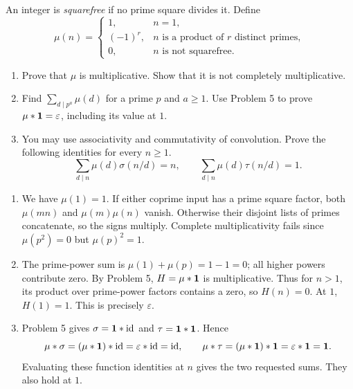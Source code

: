 \instructorbreak
{}
An integer is \emph{squarefree} if no prime square divides it. Define
\[
  \mu(n)=
  \begin{cases}
    1,&n=1,\\
    (-1)^r,&n\text{ is a product of }r\text{ distinct primes},\\
    0,&n\text{ is not squarefree}.
  \end{cases}
\]
\begin{enumerate}
  \item Prove that $\mu$ is multiplicative. Show that it is not
  completely multiplicative. 
  \item Find $\sum_{d\mid p^a}\mu(d)$ for a prime $p$ and $a\ge1$.
  Use Problem 5 to prove $\mu*\mathbf{1}=\varepsilon$, including its
  value at $1$. 
  \item You may use associativity and commutativity of convolution.
  Prove the following identities for every $n\ge1$. 
  \[
    \sum_{d\mid n}\mu(d)\sigma(n/d)=n,
    \qquad
    \sum_{d\mid n}\mu(d)\tau(n/d)=1.
  \]
\end{enumerate}
\begin{solution}
\begin{enumerate}
  \item We have $\mu(1)=1$. If either coprime input has a prime square
  factor, both $\mu(mn)$ and $\mu(m)\mu(n)$ vanish. Otherwise their
  disjoint lists of primes concatenate, so the signs multiply.
  Complete multiplicativity fails since $\mu(p^2)=0$ but
  $\mu(p)^2=1$.
  \item The prime-power sum is $\mu(1)+\mu(p)=1-1=0$;
  all higher powers contribute zero. By Problem 5,
  $H=\mu*\mathbf{1}$ is multiplicative. Thus for $n>1$, its product
  over prime-power factors contains a zero, so $H(n)=0$.
  At $1$, $H(1)=1$. This is precisely $\varepsilon$.
  \item Problem 5 gives $\sigma=\mathbf{1}*\operatorname{id}$ and
  $\tau=\mathbf{1}*\mathbf{1}$. Hence
  \[
    \mu*\sigma=(\mu*\mathbf{1})*\operatorname{id}=\varepsilon*\operatorname{id}=\operatorname{id},
    \qquad
    \mu*\tau=(\mu*\mathbf{1})*\mathbf{1}=\varepsilon*\mathbf{1}=\mathbf{1}.
  \]
  Evaluating these function identities at $n$ gives the two requested
  sums. They also hold at $1$.
\end{enumerate}
\end{solution}

